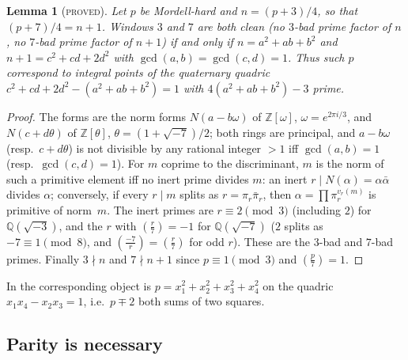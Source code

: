\documentclass[11pt,reqno]{amsart}
\newtheorem{lemma}[theorem]{Lemma}
\theoremstyle{definition}
\newcommand{\Z}{\mathbb Z}
\newcommand{\Q}{\mathbb Q}
\newcommand{\leg}[2]{\left(\frac{#1}{#2}\right)}
\newcommand{\status}[1]{\textup{\textsc{#1}}}
\begin{document}
\begin{lemma}[\status{proved}]\label{lem:quadric}
Let $p$ be Mordell-hard and $n=(p+3)/4$, so that $(p+7)/4=n+1$.  Windows
$3$ and $7$ are both clean (no $3$-bad prime factor of $n$, no $7$-bad
prime factor of $n+1$) if and only if $n=a^2+ab+b^2$ and $n+1=c^2+cd+2d^2$
with $\gcd(a,b)=\gcd(c,d)=1$.  Thus such $p$ correspond to integral
points of the quaternary quadric $c^2+cd+2d^2-(a^2+ab+b^2)=1$ with
$4(a^2+ab+b^2)-3$ prime.
\end{lemma}

\begin{proof}
The forms are the norm forms $N(a-b\omega)$ of $\Z[\omega]$,
$\omega=e^{2\pi i/3}$, and $N(c+d\theta)$ of $\Z[\theta]$,
$\theta=(1+\sqrt{-7})/2$; both rings are principal, and $a-b\omega$
(resp.\ $c+d\theta$) is not divisible by any rational integer $>1$ iff
$\gcd(a,b)=1$ (resp.\ $\gcd(c,d)=1$).  For $m$ coprime to the
discriminant, $m$ is the norm of such a primitive element iff no inert
prime divides $m$: an inert $r\mid N(\alpha)=\alpha\bar\alpha$ divides
$\alpha$; conversely, if every $r\mid m$ splits as $r=\pi_r\bar\pi_r$, then
$\alpha=\prod\pi_r^{v_r(m)}$ is primitive of norm~$m$.  The inert primes are
$r\equiv2\pmod3$ (including $2$) for $\Q(\sqrt{-3})$, and the $r$ with
$\leg r7=-1$ for $\Q(\sqrt{-7})$ ($2$ splits as $-7\equiv1\pmod8$, and
$\leg{-7}r=\leg r7$ for odd $r$).  These are the $3$-bad and $7$-bad
primes.  Finally $3\nmid n$ and $7\nmid n+1$ since $p\equiv1\pmod3$ and
$\leg p7=1$.
\end{proof}

In \cite{FI09} the corresponding object is $p=x_1^2+x_2^2+x_3^2+x_4^2$ on
the quadric $x_1x_4-x_2x_3=1$, i.e.\ $p\mp2$ both sums of two squares.

\subsection{Parity is necessary}
\end{document}
